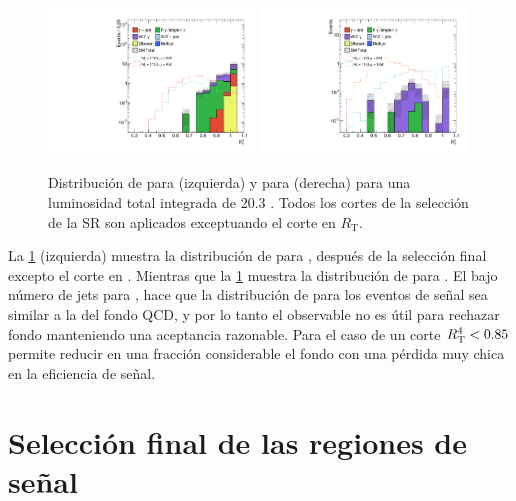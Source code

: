 

\begin{figure}[!h]
  \centering

  \includegraphics[width=0.49\textwidth]{figures/rt4_srl}
  \includegraphics[width=0.49\textwidth]{figures/rt2_srh}

  \caption{Distribución de {\rt} para {\SRL}  (izquierda) y {\rtt} para {\SRH} (derecha)
    para una luminosidad total integrada de 20.3 \ifb. Todos los cortes de la selección
    de la SR son aplicados exceptuando el corte en $R_\mathrm{T}$.}
  \label{fig:opt_rt}
\end{figure}

La \cref{fig:opt_rt} (izquierda) muestra la distribución de {\rtt} para {\SRH},
después de la selección final excepto el corte en {\rtt}. Mientras que la
\cref{fig:opt_rt} muestra la distribución de {\rt} para {\SRL}. El bajo número
de jets para {\SRH}, hace que la distribución de {\rtt} para los eventos de
señal sea similar a la del fondo QCD, y por lo tanto el observable no es útil
para rechazar fondo manteniendo una aceptancia razonable. Para el caso de {\SRL}
un corte $R_{\mathrm{T}}^{4} < 0.85$ permite reducir en una fracción considerable el fondo con
una pérdida muy chica en la eficiencia de señal.



\section{Selección final de las regiones de se\~nal}\label{sec:signal_regions}

